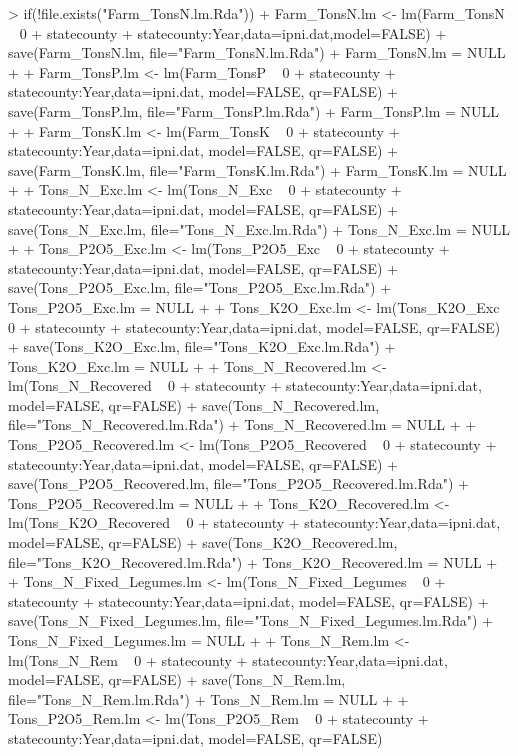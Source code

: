\documentclass{report}
\begin{document}
\begin{Schunk}
\begin{Sinput}
> if(!file.exists("Farm_TonsN.lm.Rda")) {
+      Farm_TonsN.lm <- lm(Farm_TonsN ~ 0 + statecounty + statecounty:Year,data=ipni.dat,model=FALSE)
+      save(Farm_TonsN.lm, file="Farm_TonsN.lm.Rda")
+      Farm_TonsN.lm = NULL
+      
+      Farm_TonsP.lm <- lm(Farm_TonsP  ~ 0 + statecounty + statecounty:Year,data=ipni.dat, model=FALSE, qr=FALSE)
+      save(Farm_TonsP.lm, file="Farm_TonsP.lm.Rda")
+      Farm_TonsP.lm = NULL
+      
+      Farm_TonsK.lm <- lm(Farm_TonsK ~ 0 + statecounty + statecounty:Year,data=ipni.dat, model=FALSE, qr=FALSE)
+      save(Farm_TonsK.lm, file="Farm_TonsK.lm.Rda")
+      Farm_TonsK.lm =  NULL
+      
+      Tons_N_Exc.lm <- lm(Tons_N_Exc ~ 0 + statecounty + statecounty:Year,data=ipni.dat, model=FALSE, qr=FALSE)
+      save(Tons_N_Exc.lm, file="Tons_N_Exc.lm.Rda")
+      Tons_N_Exc.lm = NULL
+      
+      Tons_P2O5_Exc.lm <- lm(Tons_P2O5_Exc ~ 0 + statecounty + statecounty:Year,data=ipni.dat, model=FALSE, qr=FALSE)
+      save(Tons_P2O5_Exc.lm, file="Tons_P2O5_Exc.lm.Rda")
+      Tons_P2O5_Exc.lm = NULL
+      
+      Tons_K2O_Exc.lm <- lm(Tons_K2O_Exc ~ 0 + statecounty + statecounty:Year,data=ipni.dat, model=FALSE, qr=FALSE)
+      save(Tons_K2O_Exc.lm, file="Tons_K2O_Exc.lm.Rda")
+      Tons_K2O_Exc.lm = NULL
+      
+      Tons_N_Recovered.lm <- lm(Tons_N_Recovered ~ 0 + statecounty + statecounty:Year,data=ipni.dat, model=FALSE, qr=FALSE)
+      save(Tons_N_Recovered.lm, file="Tons_N_Recovered.lm.Rda")
+      Tons_N_Recovered.lm = NULL
+      
+      Tons_P2O5_Recovered.lm <- lm(Tons_P2O5_Recovered ~ 0 + statecounty + statecounty:Year,data=ipni.dat, model=FALSE, qr=FALSE)
+      save(Tons_P2O5_Recovered.lm, file="Tons_P2O5_Recovered.lm.Rda")
+      Tons_P2O5_Recovered.lm = NULL
+      
+      Tons_K2O_Recovered.lm <- lm(Tons_K2O_Recovered ~ 0 + statecounty + statecounty:Year,data=ipni.dat, model=FALSE, qr=FALSE) 
+      save(Tons_K2O_Recovered.lm, file="Tons_K2O_Recovered.lm.Rda")
+      Tons_K2O_Recovered.lm = NULL
+      
+      Tons_N_Fixed_Legumes.lm <- lm(Tons_N_Fixed_Legumes ~ 0 + statecounty + statecounty:Year,data=ipni.dat, model=FALSE, qr=FALSE)
+      save(Tons_N_Fixed_Legumes.lm, file="Tons_N_Fixed_Legumes.lm.Rda")
+      Tons_N_Fixed_Legumes.lm = NULL
+      
+      Tons_N_Rem.lm <- lm(Tons_N_Rem ~ 0 + statecounty + statecounty:Year,data=ipni.dat, model=FALSE, qr=FALSE)
+      save(Tons_N_Rem.lm, file="Tons_N_Rem.lm.Rda")
+      Tons_N_Rem.lm =  NULL
+      
+      Tons_P2O5_Rem.lm <- lm(Tons_P2O5_Rem ~ 0 + statecounty + statecounty:Year,data=ipni.dat, model=FALSE, qr=FALSE)
}
\end{Sinput}
\end{Schunk}
\end{document}
